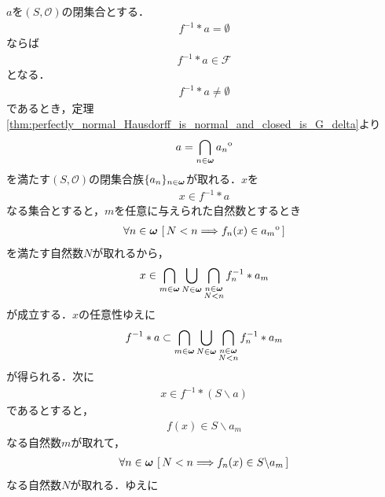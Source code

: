 		\begin{prf}
			$a$を$(S,\mathscr{O})$の閉集合とする．
			\begin{align}
				f^{-1} \ast a = \emptyset
			\end{align}
			ならば
			\begin{align}
				f^{-1} \ast a \in \mathscr{F}
			\end{align}
			となる．
			\begin{align}
				f^{-1} \ast a \neq \emptyset
			\end{align}
			であるとき，定理\ref{thm:perfectly_normal_Hausdorff_is_normal_and_closed_is_G_delta}より
			\begin{align}
				a = \bigcap_{n \in {\boldsymbol \omega}} {a_n}^{\mathrm{o}}
			\end{align}
			を満たす$(S,\mathscr{O})$の閉集合族$\{a_n\}_{n \in {\boldsymbol \omega}}$が取れる．$x$を
			\begin{align}
				x \in f^{-1} \ast a
			\end{align}
			なる集合とすると，$m$を任意に与えられた自然数とするとき
			\begin{align}
				\forall n \in {\boldsymbol \omega}\, \left[\, N < n \Longrightarrow f_n(x) \in {a_m}^{\mathrm{o}}\, \right]
			\end{align}
			を満たす自然数$N$が取れるから，
			\begin{align}
				x \in \bigcap_{m \in {\boldsymbol \omega}} \bigcup_{N \in {\boldsymbol \omega}} \bigcap_{\substack{n \in {\boldsymbol \omega} \\ N < n}} 
				f_n^{-1} \ast a_m
			\end{align}
			が成立する．$x$の任意性ゆえに
			\begin{align}
				f^{-1} \ast a \subset 
				\bigcap_{m \in {\boldsymbol \omega}} \bigcup_{N \in {\boldsymbol \omega}} \bigcap_{\substack{n \in {\boldsymbol \omega} \\ N < n}} f_n^{-1} \ast a_m
				\label{fom:lem_measurability_metric_space_1}
			\end{align}
			が得られる．次に
			\begin{align}
				x \in f^{-1} \ast (S \backslash a)
			\end{align}
			であるとすると，
			\begin{align}
				f(x) \in S \backslash a_m
			\end{align}
			なる自然数$m$が取れて，
			\begin{align}
				\forall n \in {\boldsymbol \omega}\, \left[\, N < n \Longrightarrow f_n(x) \in S \backslash a_m\, \right]
			\end{align}
			なる自然数$N$が取れる．ゆえに
			\begin{align}

\end{align}
\end{prf}

